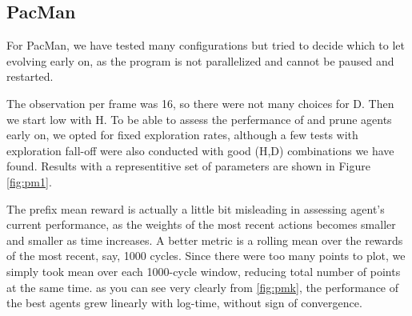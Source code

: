 \documentclass{article}
\let\Oldsubsection\subsection
\renewcommand{\subsection}{\FloatBarrier\Oldsubsection}
\begin{document}
\begin{flushleft}
\newpage
\subsection{PacMan}

%


For PacMan, we have tested many
configurations but tried to decide
which to let evolving early on,
as the program is not parallelized
and cannot be paused and restarted.

The observation per frame was
16, so there were not many choices for D.
Then we start low with H.
To be able to assess the perfermance 
of and prune agents early on,
we opted for fixed exploration rates,
although a few tests with exploration 
fall-off were also conducted with
good (H,D) combinations we have found.
Results with a representitive set of parameters are shown in Figure \ref{fig:pm1}.

The prefix mean reward is actually a little bit misleading in
assessing agent's current performance, as the 
weights of the most recent actions becomes
smaller and smaller as time increases.
A better metric is a rolling mean over the rewards of the most recent,
say, 1000 cycles.
Since there were too many points to plot, we simply took
mean over each 1000-cycle window, reducing total
number of points at the same time.
as you can see very clearly from \ref{fig:pmk}, the performance of 
the best agents grew linearly with log-time, without
sign of convergence.



\end{flushleft}
\end{document}
